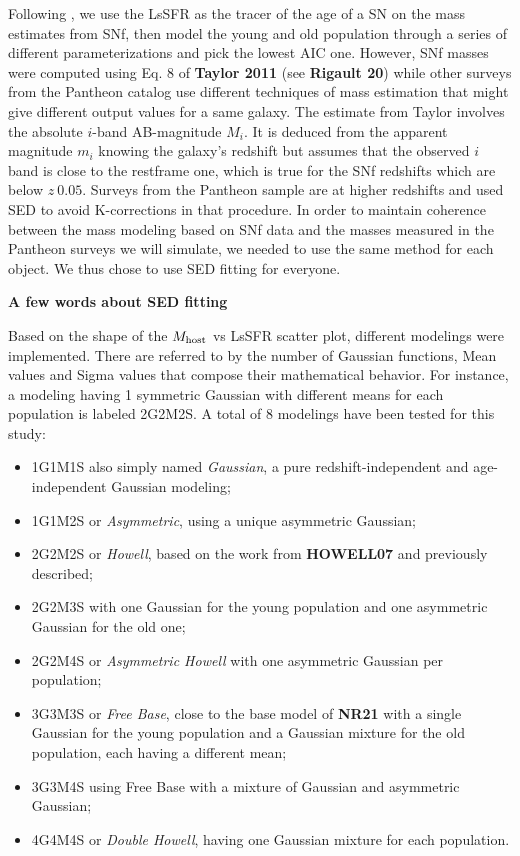 \documentclass[../main/main.tex]{subfiles}
\begin{document}
Following \cite{nicolas2021}, we use the LsSFR as the tracer of the age of a SN on
the mass estimates from SNf, then model the young and old population through a
series of different parameterizations and pick the lowest AIC one. However, SNf
masses were computed using Eq. 8 of \textbf{Taylor 2011} (see \textbf{Rigault
20}) while other surveys from the Pantheon catalog use different techniques of
mass estimation that might give different output values for a same galaxy. The
estimate from Taylor involves the absolute $i$-band AB-magnitude $M_i$. It is
deduced from the apparent magnitude $m_i$ knowing the galaxy's redshift but
assumes that the observed $i$ band is close to the restframe one, which is true
for the SNf redshifts which are below $z~0.05$. Surveys from the Pantheon sample
are at higher redshifts and used SED to avoid K-corrections in that procedure.
In order to maintain coherence between the mass modeling based on SNf data and
the masses measured in the Pantheon surveys we will simulate, we needed to use
the same method for each object. We thus chose to use SED fitting for everyone.

\textbf{A few words about SED fitting}

Based on the shape of the $M_{\rm host}$ vs LsSFR scatter plot, different
modelings were implemented. There are referred to by the number of Gaussian
functions, Mean values and Sigma values that compose their mathematical
behavior. For instance, a modeling having 1 symmetric Gaussian with different
means for each population is labeled 2G2M2S. A total of 8 modelings have been
tested for this study:

\begin{itemize}
    \item 1G1M1S also simply named \textit{Gaussian}, a pure
        redshift-independent and age-independent Gaussian modeling;

    \item 1G1M2S or \textit{Asymmetric}, using a unique asymmetric Gaussian;

    \item 2G2M2S or \textit{Howell}, based on the work from \textbf{HOWELL07}
        and previously described;

    \item 2G2M3S with one Gaussian for the young population and one asymmetric
        Gaussian for the old one;

    \item 2G2M4S or \textit{Asymmetric Howell} with one asymmetric Gaussian per
        population;

    \item 3G3M3S or \textit{Free Base}, close to the base model of \textbf{NR21}
        with a single Gaussian for the young population and a Gaussian mixture
        for the old population, each having a different mean;

    \item 3G3M4S using Free Base with a mixture of Gaussian and asymmetric
        Gaussian;

    \item 4G4M4S or \textit{Double Howell}, having one Gaussian mixture for each
        population.
\end{itemize}
\end{document}
